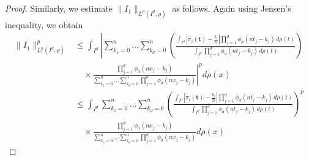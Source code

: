\documentclass[10pt,a4paper]{amsart}
\newcommand{\LP}{L^p(I^d, \rho)}
\begin{document}
\begin{proof}
Similarly, we estimate $\|I_1\|_{\LP}$ as follows. Again using Jensen's inequality, we obtain
\begin{align}
\|I_1\|^p_{\LP} 
&\leq \int_{I^d} \left| \sum_{k_1=0}^n \ldots \sum_{k_d=0}^n \left( \frac{\int_{I^d} \left|\pi_i(\mathbf{t}) - \frac{k_i}{n}\right| \prod_{j=1}^d \phi_\sigma(nt_j - k_j) \, d\rho(t)}{\int_{I^d} \prod_{j=1}^d \phi_\sigma(nt_j - k_j) \, d\rho(t)} \right) \right. \nonumber \\
&\quad \times \left. \frac{\prod_{j=1}^d \phi_\sigma(nx_j - k_j)}{\sum_{k_1=0}^n \ldots \sum_{k_d=0}^n \prod_{j=1}^d \phi_\sigma(nx_j - k_j)} \right|^p d\rho(x)\nonumber \\
&\leq \int_{I^d} \sum_{k_1=0}^n \ldots \sum_{k_d=0}^n \left( \frac{\int_{I^d} \left|\pi_i(\mathbf{t}) - \frac{k_i}{n}\right| \prod_{j=1}^d \phi_\sigma(nt_j - k_j) \, d\rho(t)}{\int_{I^d} \prod_{j=1}^d \phi_\sigma(nt_j - k_j) \, d\rho(t)} \right)^p \nonumber\\
&\quad \times \frac{\prod_{j=1}^d \phi_\sigma(nx_j - k_j)}{\sum_{k_1=0}^n \ldots \sum_{k_d=0}^n \prod_{j=1}^d \phi_\sigma(nx_j - k_j)}  d\rho(x) \nonumber
\end{align}


\end{proof}
\end{document}
